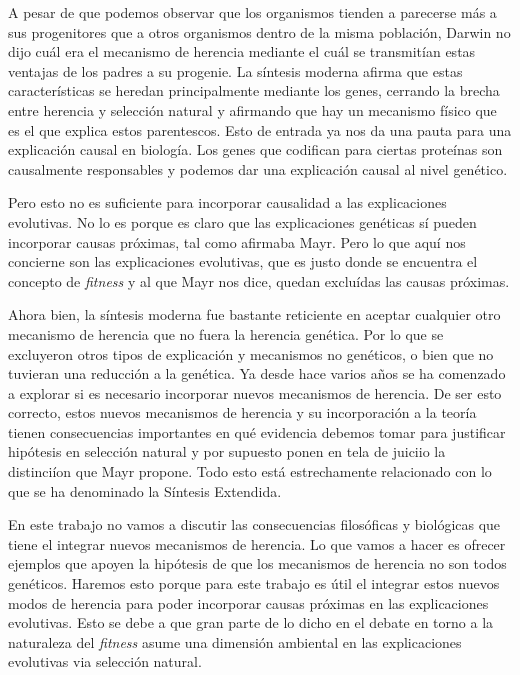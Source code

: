 A pesar de que podemos observar que los organismos tienden a parecerse más a sus progenitores que a otros organismos dentro de la misma población, Darwin no dijo cuál era el mecanismo de herencia mediante el cuál se transmitían estas ventajas de los padres a su progenie. La síntesis moderna afirma que estas características se heredan principalmente mediante los genes, cerrando la brecha entre herencia y selección natural y afirmando que hay un mecanismo físico que es el que explica estos parentescos. Esto de entrada ya nos da una pauta para una explicación causal en biología. Los genes que codifican para ciertas proteínas son causalmente responsables y podemos dar una explicación causal al nivel genético.

Pero esto no es suficiente para incorporar causalidad a las explicaciones evolutivas. No lo es porque es claro que las explicaciones genéticas sí pueden incorporar causas próximas, tal como afirmaba Mayr. Pero lo que aquí nos concierne son las explicaciones evolutivas, que es justo donde se encuentra el concepto de \emph{fitness} y al que Mayr nos dice, quedan excluídas las causas próximas.

Ahora bien, la síntesis moderna fue bastante reticiente en aceptar cualquier otro mecanismo de herencia que no fuera la herencia genética. Por lo que se excluyeron otros tipos de explicación y mecanismos no genéticos, o bien que no tuvieran una reducción a la genética. Ya desde hace varios años se ha comenzado a explorar si es necesario incorporar nuevos mecanismos de herencia. De ser esto correcto, estos nuevos mecanismos de herencia y su incorporación a la teoría tienen consecuencias importantes en qué evidencia debemos tomar para justificar hipótesis en selección natural y por supuesto ponen en tela de juiciio la distinciíon que Mayr propone. Todo esto está estrechamente relacionado con lo que se ha denominado la Síntesis Extendida.

En este trabajo no vamos a discutir las consecuencias filosóficas y biológicas que tiene el integrar nuevos mecanismos de herencia. Lo que vamos a hacer es ofrecer ejemplos que apoyen la hipótesis de que los mecanismos de herencia no son todos genéticos. Haremos esto porque para este trabajo es útil el integrar estos nuevos modos de herencia para poder incorporar causas próximas en las explicaciones evolutivas. Esto se debe a que gran parte de lo dicho en el debate en torno a la naturaleza del \emph{fitness} asume una dimensión ambiental en las explicaciones evolutivas via selección natural.

